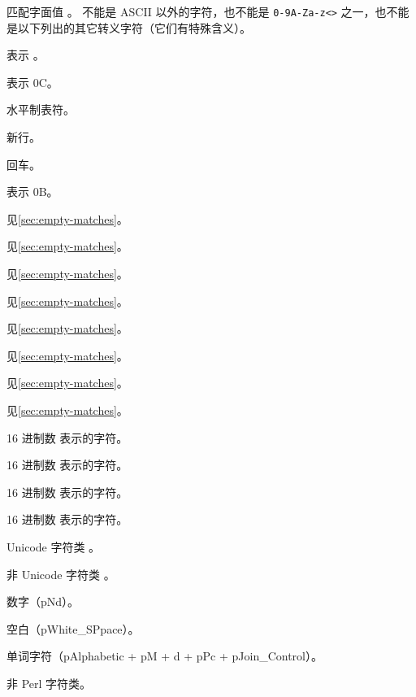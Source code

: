 \documentclass[class=article,openany]{cusdoc}[2025/10/10]
\begin{document}
\begin{regexsyntax}\def\p{\escape p}
  \item[\texttt{\textbackslash \meta{char}}] 匹配字面值 。 不能是 ASCII 以外的字符，也不能是 \texttt{0-9A-Za-z<>} 之一，也不能是以下列出的其它转义字符（它们有特殊含义）。
  \item[\escape a] 表示 。
  \item[\escape f] 表示 \x 0C。
  \item[\escape t] 水平制表符。
  \item[\escape n] 新行。
  \item[\escape r] 回车。
  \item[\escape v] 表示 \x 0B。
  \item[\escape A] 见\cref{sec:empty-matches}。
  \item[\escape z] 见\cref{sec:empty-matches}。
  \item[\escape b] 见\cref{sec:empty-matches}。
  \item[\escape B] 见\cref{sec:empty-matches}。
  \item[\escape b{start}] 见\cref{sec:empty-matches}。
  \item[\escape b{end}] 见\cref{sec:empty-matches}。
  \item[\escape b{start-half}] 见\cref{sec:empty-matches}。
  \item[\escape b{end-half}] 见\cref{sec:empty-matches}。
  \item[\x hh] 16 进制数  表示的字符。
  \item[\x{\meta{hex num}}] 16 进制数  表示的字符。
  \item[\u hhhh] 16 进制数  表示的字符。
  \item[\u{\meta{hex num}}] 16 进制数  表示的字符。
  \item[\escape p{\meta{class}}] Unicode 字符类 。
  \item[\escape P{\meta{class}}] 非 Unicode 字符类 。
  \item[\escape d] 数字（\p{Nd}）。
  \item[\escape s] 空白（\p{White\V_SPpace}）。
  \item[\escape w] 单词字符（\p{Alphabetic} + \p{M} + \escape d + \p{Pc} + \p{Join\V_Control}）。
  \item[\escape D, \escape S, \escape W] 非 Perl 字符类。
\end{regexsyntax}
\end{document}
